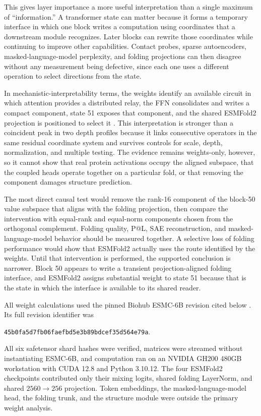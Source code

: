 \documentclass[11pt]{article}
\newcommand{\ESMC}{ESMC-6B\xspace}
\newcommand{\ESMFold}{ESMFold2\xspace}
\begin{document}
This gives layer importance a more useful interpretation than a single maximum of ``information.'' A transformer state can matter because it forms a temporary interface in which one block writes a computation using coordinates that a downstream module recognizes. Later blocks can rewrite those coordinates while continuing to improve other capabilities. Contact probes, sparse autoencoders, masked-language-model perplexity, and folding projections can then disagree without any measurement being defective, since each one uses a different operation to select directions from the state.

In mechanistic-interpretability terms, the weights identify an available circuit in which attention provides a distributed relay, the FFN consolidates and writes a compact component, state 51 exposes that component, and the shared \ESMFold projection is positioned to select it \cite{olah2020}. This interpretation is stronger than a coincident peak in two depth profiles because it links consecutive operators in the same residual coordinate system and survives controls for scale, depth, normalization, and multiple testing. The evidence remains weights-only, however, so it cannot show that real protein activations occupy the aligned subspace, that the coupled heads operate together on a particular fold, or that removing the component damages structure prediction.

The most direct causal test would remove the rank-16 component of the block-50 value subspace that aligns with the folding projection, then compare the intervention with equal-rank and equal-norm components chosen from the orthogonal complement. Folding quality, P@L, SAE reconstruction, and masked-language-model behavior should be measured together. A selective loss of folding performance would show that \ESMFold actually uses the route identified by the weights. Until that intervention is performed, the supported conclusion is narrower. Block 50 appears to write a transient projection-aligned folding interface, and \ESMFold assigns substantial weight to state 51 because that is the state in which the interface is available to its shared reader.

All weight calculations used the pinned Biohub \ESMC revision cited below
\cite{biohub2026}. Its full revision identifier was
\begin{center}
\small\texttt{45b0fa5d7fb06faefbd5e3b89bdcef35d564e79a}.
\end{center}
All six safetensor shard hashes were verified, matrices were streamed without
instantiating \ESMC, and computation ran on an NVIDIA GH200 480GB workstation
with CUDA 12.8 and Python 3.10.12. The four \ESMFold checkpoints contributed
only their mixing logits, shared folding LayerNorm, and shared
$2560\rightarrow256$ projection. Token embeddings, the masked-language-model
head, the folding trunk, and the structure module were outside the primary
weight analysis.
\end{document}
